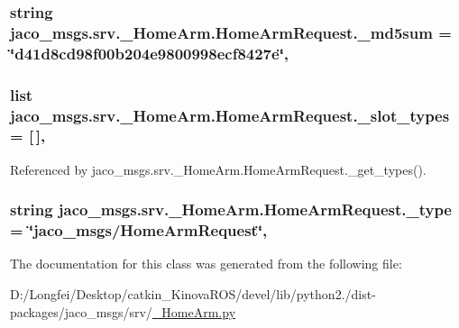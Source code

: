 \subsubsection[{\texorpdfstring{\+\_\+md5sum}{_md5sum}}]{\setlength{\rightskip}{0pt plus 5cm}string jaco\+\_\+msgs.\+srv.\+\_\+\+Home\+Arm.\+Home\+Arm\+Request.\+\_\+md5sum = \char`\"{}d41d8cd98f00b204e9800998ecf8427e\char`\"{}\hspace{0.3cm}{\ttfamily [static]}, {\ttfamily [private]}}\hypertarget{classjaco__msgs_1_1srv_1_1__HomeArm_1_1HomeArmRequest_af76cc57fe2dc2076808cfcf95909f90d}{}\label{classjaco__msgs_1_1srv_1_1__HomeArm_1_1HomeArmRequest_af76cc57fe2dc2076808cfcf95909f90d}
\subsubsection[{\texorpdfstring{\+\_\+slot\+\_\+types}{_slot_types}}]{\setlength{\rightskip}{0pt plus 5cm}list jaco\+\_\+msgs.\+srv.\+\_\+\+Home\+Arm.\+Home\+Arm\+Request.\+\_\+slot\+\_\+types = \mbox{[}$\,$\mbox{]}\hspace{0.3cm}{\ttfamily [static]}, {\ttfamily [private]}}\hypertarget{classjaco__msgs_1_1srv_1_1__HomeArm_1_1HomeArmRequest_a408d6daf16c4b8e9c0ffef66989b7f4f}{}\label{classjaco__msgs_1_1srv_1_1__HomeArm_1_1HomeArmRequest_a408d6daf16c4b8e9c0ffef66989b7f4f}


Referenced by jaco\+\_\+msgs.\+srv.\+\_\+\+Home\+Arm.\+Home\+Arm\+Request.\+\_\+get\+\_\+types().

\subsubsection[{\texorpdfstring{\+\_\+type}{_type}}]{\setlength{\rightskip}{0pt plus 5cm}string jaco\+\_\+msgs.\+srv.\+\_\+\+Home\+Arm.\+Home\+Arm\+Request.\+\_\+type = \char`\"{}jaco\+\_\+msgs/{\bf Home\+Arm\+Request}\char`\"{}\hspace{0.3cm}{\ttfamily [static]}, {\ttfamily [private]}}\hypertarget{classjaco__msgs_1_1srv_1_1__HomeArm_1_1HomeArmRequest_ae2e02f83931caf1d32c6afbdc97821c0}{}\label{classjaco__msgs_1_1srv_1_1__HomeArm_1_1HomeArmRequest_ae2e02f83931caf1d32c6afbdc97821c0}


The documentation for this class was generated from the following file\+:\begin{DoxyCompactItemize}
\item 
D\+:/\+Longfei/\+Desktop/catkin\+\_\+\+Kinova\+R\+O\+S/devel/lib/python2./dist-\/packages/jaco\+\_\+msgs/srv/\hyperlink{__HomeArm_8py}{\+\_\+\+Home\+Arm.\+py}\end{DoxyCompactItemize}
